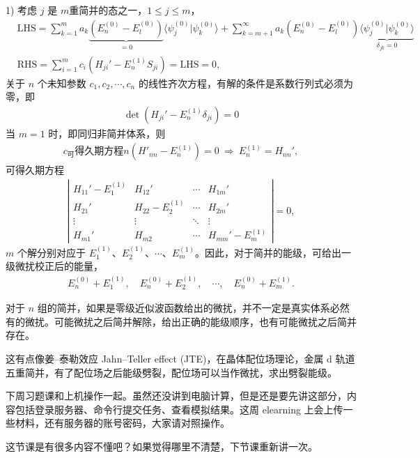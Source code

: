 1) 考虑 $j$ 是 $m$重简并的态之一，$1 \leqslant j \leqslant m$，
\begin{align}
    &\text{LHS} = 
    \sum_{k=1}^m a_k 
    \underbrace{(E_n^{(0)} - E_l^{(0)})}_{=0}
    \langle \psi_j^{(0)} | \psi_k^{(0)} \rangle
    +
    \sum_{k=m+1}^\infty a_k 
    (E_n^{(0)} - E_l^{(0)})
    \underbrace{\langle \psi_j^{(0)} | \psi_k^{(0)} \rangle}_{\delta_{jk}=0}
    \\
    &\text{RHS} = \sum_{i=1}^{m} c_i (H_{ji}' - E_n^{(1)}S_{ji}) = \text{LHS} = 0,
\end{align}
关于 $n$ 个未知参数 $c_1, c_2, \cdots, c_n$ 的线性齐次方程，有解的条件是系数行列式必须为零，即
\begin{align}
    \det\left(H_{ji}' - E_n^{(1)} \delta_{ji}\right) = 0
\end{align}
当 $m = 1$ 时，即同归非简并体系，则
\begin{align}
    c_可得久期方程n (H'_{nn} - E_n^{(1)}) = 0 \ \Rightarrow \ E_n^{(1)} = H_{nn}', 
\end{align}
可得久期方程
\begin{align}
    \left|\begin{matrix}
        H_{11}' - E_1^{(1)} & H_{12}' & \cdots & H_{1m}' \\
        H_{21}' & H_{22} - E_2^{(1)} & \cdots & H_{2m}' \\
        \vdots & \vdots & \ddots & \vdots \\
        H_{m1}' & H_{m2} & \cdots & H_{mm}' - E_m^{(1)}
    \end{matrix}
    \right|=0,
\end{align}
$m$ 个解分别对应于 $E_1^{(1)}$、$E_2^{(1)}$、$\cdots$、$E_m^{(1)}$。因此，对于简并的能级，可给出一级微扰校正后的能量，
\begin{align}
    E_n^{(0)}+E_1^{(1)}, \quad E_n^{(0)}+E_2^{(1)}, \quad\cdots,\quad E_n^{(0)}+E_m^{(1)}. 
\end{align}

对于 $n$ 组的简并，如果是零级近似波函数给出的微扰，并不一定是真实体系必然有的微扰。可能微扰之后简并解除，给出正确的能级顺序，也有可能微扰之后简并存在。

这有点像姜--泰勒效应 Jahn--Teller effect (JTE)，在晶体配位场理论，金属 d 轨道五重简并，有了配位场之后能级劈裂，配位场可以当作微扰，求出劈裂能级。

下周习题课和上机操作一起。虽然还没讲到电脑计算，但是还是要先讲这部分，内容包括登录服务器、命令行提交任务、查看模拟结果。这周 elearning 上会上传一些材料，还有服务器的账号密码，大家请对照操作。

这节课是有很多内容不懂吧？如果觉得哪里不清楚，下节课重新讲一次。